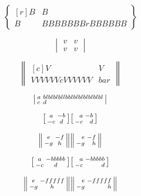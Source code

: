 \documentclass{article}
\begin{document}
\[
\begin{Bmatrix*}[r]
B & B \\
B & BBBBBBBrBBBBBB
\end{Bmatrix*}
\]

\[
\begin{vmatrix*}
v & v \\
v & v
\end{vmatrix*}
\]

\[
\begin{Vmatrix*}[c]
V & V \\
VVVVVVcVVVVVV & bar
\end{Vmatrix*}
\]

\[
\begin{vsmallmatrix*}[l]
a & blblblbllbblblblblblblbl \\
c & d
\end{vsmallmatrix*}
\]

\[
\begin{bsmallmatrix} a & -b \\ -c & d \end{bsmallmatrix}
\begin{bsmallmatrix*}[r] a & -b \\ -c & d \end{bsmallmatrix*}
\]

\[
\begin{Vsmallmatrix} e & -f \\ -g & h \end{Vsmallmatrix}
\begin{Vsmallmatrix*}[r] e & -f \\ -g & h \end{Vsmallmatrix*}
\]

\[
\begin{bsmallmatrix*} a & -bbbbb \\ -c & d \end{bsmallmatrix*}
\begin{bsmallmatrix*}[r] a & -bbbbb \\ -c & d \end{bsmallmatrix*}
\]

\[
\begin{Vsmallmatrix*} e & -fffff \\ -g & h \end{Vsmallmatrix*}
\begin{Vsmallmatrix*}[r] e & -fffff \\ -g & h \end{Vsmallmatrix*}
\]

\end{document}
